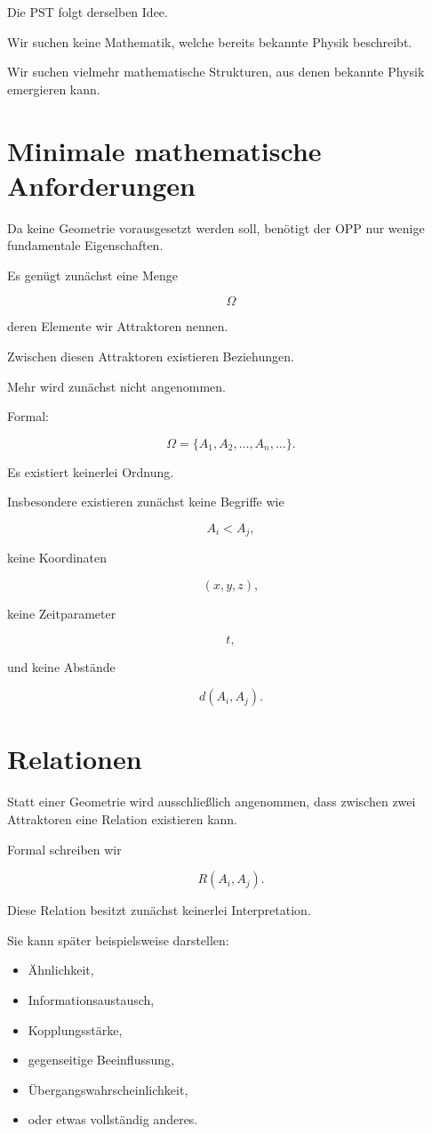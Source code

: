 Die PST folgt derselben Idee.

Wir suchen keine Mathematik, welche bereits bekannte Physik beschreibt.

Wir suchen vielmehr mathematische Strukturen, aus denen bekannte
Physik emergieren kann.

\section{Minimale mathematische Anforderungen}

Da keine Geometrie vorausgesetzt werden soll, benötigt der OPP nur
wenige fundamentale Eigenschaften.

Es genügt zunächst eine Menge

\[
\Omega
\]

deren Elemente wir Attraktoren nennen.

Zwischen diesen Attraktoren existieren Beziehungen.

Mehr wird zunächst nicht angenommen.

Formal:

\[
\Omega
=
\{A_1,A_2,\ldots,A_n,\ldots\}.
\]

Es existiert keinerlei Ordnung.

Insbesondere existieren zunächst keine Begriffe wie

\[
A_i < A_j,
\]

keine Koordinaten

\[
(x,y,z),
\]

keine Zeitparameter

\[
t,
\]

und keine Abstände

\[
d(A_i,A_j).
\]

\section{Relationen}

Statt einer Geometrie wird ausschließlich angenommen, dass zwischen
zwei Attraktoren eine Relation existieren kann.

Formal schreiben wir

\[
R(A_i,A_j).
\]

Diese Relation besitzt zunächst keinerlei Interpretation.

Sie kann später beispielsweise darstellen:

\begin{itemize}
\item Ähnlichkeit,
\item Informationsaustausch,
\item Kopplungsstärke,
\item gegenseitige Beeinflussung,
\item Übergangswahrscheinlichkeit,
\item oder etwas vollständig anderes.
\end{itemize}

